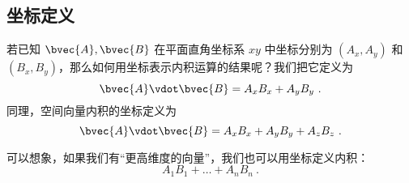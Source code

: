 \subsection{坐标定义}
若已知 $\bvec{A}, \bvec{B}$ 在平面直角坐标系 $xy$ 中坐标分别为 $(A_x, A_y)$ 和  $(B_x, B_y)$，那么如何用坐标表示内积运算的结果呢？我们把它定义为
\begin{equation}\label{eq_Dot_5}
\bvec{A} \vdot \bvec{B} = A_x B_x + A_y B_y~.
\end{equation}
同理，空间向量内积的坐标定义为
\begin{equation}\label{eq_Dot_4}
\bvec{A} \vdot \bvec{B} = A_x B_x + A_y B_y + A_z B_z	~.
\end{equation}

可以想象，如果我们有“更高维度的向量”，我们也可以用坐标定义内积：
\begin{equation}
A_1 B_1 + \dots + A_n B_n ~.
\end{equation}



